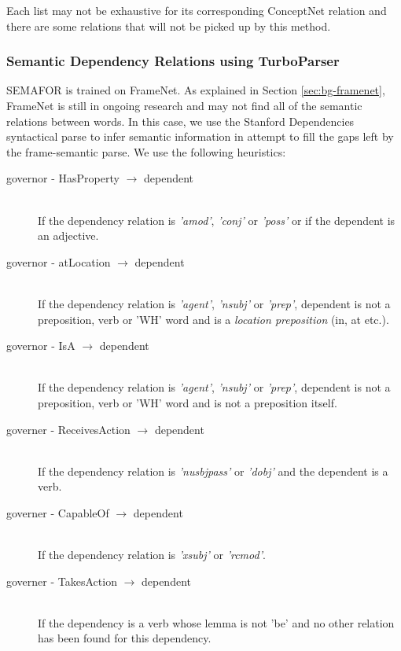 Each list may not be exhaustive for its corresponding ConceptNet relation and there are some relations that will not be picked up by this method.

\subsubsection{Semantic Dependency Relations using TurboParser}
\label{sec:turbo}

SEMAFOR is trained on FrameNet. As explained in Section \ref{sec:bg-framenet}, FrameNet is still in ongoing research and may not find all of the semantic relations between words. In this case, we use the Stanford Dependencies syntactical parse to infer semantic information in attempt to fill the gaps left by the frame-semantic parse. We use the following heuristics:

\begin{description}
\item[governor - HasProperty $\rightarrow$ dependent]  \hfill \\
If the dependency relation is \textit{'amod'}, \textit{'conj'} or \textit{'poss'} or if the dependent is an adjective.

\item[governor - atLocation $\rightarrow$ dependent] \hfill \\
If the dependency relation is \textit{'agent'}, \textit{'nsubj'} or \textit{'prep'}, dependent is not a preposition, verb or 'WH' word and is a \textit{location preposition} (in, at etc.).
	
\item[governor - IsA $\rightarrow$ dependent] \hfill \\
If the dependency relation is \textit{'agent'}, \textit{'nsubj'} or \textit{'prep'}, dependent is not a preposition, verb or 'WH' word and is not a preposition itself.
	
\item[governer - ReceivesAction $\rightarrow$ dependent] \hfill \\
If the dependency relation is \textit{'nusbjpass'} or \textit{'dobj'} and the dependent is a verb.

\item[governer - CapableOf $\rightarrow$ dependent] \hfill \\
If the dependency relation is \textit{'xsubj'} or \textit{'rcmod'}.

\item[governer - TakesAction $\rightarrow$ dependent] \hfill \\
If the dependency is a verb whose lemma is not 'be' and no other relation has been found for this dependency.
\end{description}

